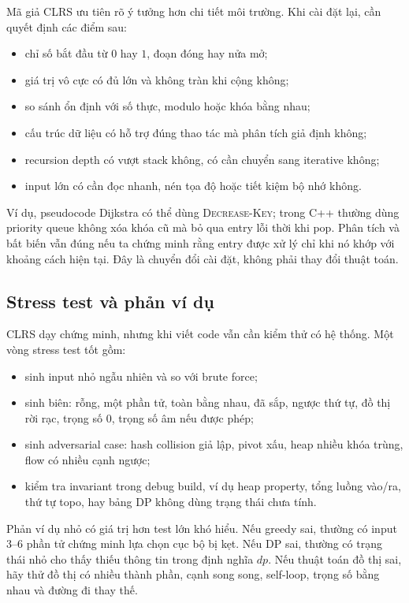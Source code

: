 \documentclass[11pt]{article}
\begin{document}
Mã giả CLRS ưu tiên rõ ý tưởng hơn chi tiết môi trường. Khi cài đặt lại, cần
quyết định các điểm sau:
\begin{itemize}
  \item chỉ số bắt đầu từ \(0\) hay \(1\), đoạn đóng hay nửa mở;
  \item giá trị vô cực có đủ lớn và không tràn khi cộng không;
  \item so sánh ổn định với số thực, modulo hoặc khóa bằng nhau;
  \item cấu trúc dữ liệu có hỗ trợ đúng thao tác mà phân tích giả định không;
  \item recursion depth có vượt stack không, có cần chuyển sang iterative không;
  \item input lớn có cần đọc nhanh, nén tọa độ hoặc tiết kiệm bộ nhớ không.
\end{itemize}

Ví dụ, pseudocode Dijkstra có thể dùng \textsc{Decrease-Key}; trong C++ thường
dùng priority queue không xóa khóa cũ mà bỏ qua entry lỗi thời khi pop. Phân
tích và bất biến vẫn đúng nếu ta chứng minh rằng entry được xử lý chỉ khi nó
khớp với khoảng cách hiện tại. Đây là chuyển đổi cài đặt, không phải thay đổi
thuật toán.

\subsection{Stress test và phản ví dụ}

CLRS dạy chứng minh, nhưng khi viết code vẫn cần kiểm thử có hệ thống. Một vòng
stress test tốt gồm:
\begin{itemize}
  \item sinh input nhỏ ngẫu nhiên và so với brute force;
  \item sinh biên: rỗng, một phần tử, toàn bằng nhau, đã sắp, ngược thứ tự,
        đồ thị rời rạc, trọng số \(0\), trọng số âm nếu được phép;
  \item sinh adversarial case: hash collision giả lập, pivot xấu, heap nhiều
        khóa trùng, flow có nhiều cạnh ngược;
  \item kiểm tra invariant trong debug build, ví dụ heap property, tổng luồng
        vào/ra, thứ tự topo, hay bảng DP không dùng trạng thái chưa tính.
\end{itemize}

Phản ví dụ nhỏ có giá trị hơn test lớn khó hiểu. Nếu greedy sai, thường có input
3--6 phần tử chứng minh lựa chọn cục bộ bị kẹt. Nếu DP sai, thường có trạng thái
nhỏ cho thấy thiếu thông tin trong định nghĩa \(dp\). Nếu thuật toán đồ thị sai,
hãy thử đồ thị có nhiều thành phần, cạnh song song, self-loop, trọng số bằng
nhau và đường đi thay thế.
\end{document}
